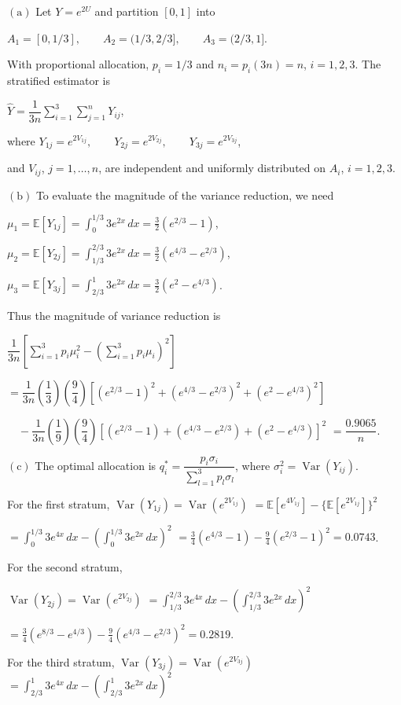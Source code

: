  $\mathrm{(a)}$ Let $Y=e^{2U}$ and partition $[0,1]$ into

$A_1=[0,1/3],\qquad A_2=(1/3,2/3],\qquad A_3=(2/3,1]$.

With proportional allocation, $p_i=1/3$ and $n_i=p_i(3n)=n$, $i=1,2,3$. The stratified estimator is

$\widehat Y=\dfrac1{3n}\sum_{i=1}^3\sum_{j=1}^nY_{ij}$,

where
$Y_{1j}=e^{2V_{1j}},\qquad Y_{2j}=e^{2V_{2j}},\qquad Y_{3j}=e^{2V_{3j}}$,

and $V_{ij}$, $j=1,\ldots,n$, are independent and uniformly distributed on $A_i$, $i=1,2,3$.

$\mathrm{(b)}$ To evaluate the magnitude of the variance reduction, we need

$\mu_1=\mathbb E[Y_{1j}]=\int_0^{1/3}3e^{2x}\,dx=\frac32(e^{2/3}-1)$,

$\mu_2=\mathbb E[Y_{2j}]=\int_{1/3}^{2/3}3e^{2x}\,dx=\frac32(e^{4/3}-e^{2/3})$,

$\mu_3=\mathbb E[Y_{3j}]=\int_{2/3}^{1}3e^{2x}\,dx=\frac32(e^2-e^{4/3})$.

Thus the magnitude of variance reduction is

$\dfrac1{3n}\left[\sum_{i=1}^3p_i\mu_i^2-\left(\sum_{i=1}^3p_i\mu_i\right)^2\right]$

$=\dfrac1{3n}\left(\dfrac13\right)\left(\dfrac94\right)
\left[(e^{2/3}-1)^2+(e^{4/3}-e^{2/3})^2+(e^2-e^{4/3})^2\right]$

$\quad-\dfrac1{3n}\left(\dfrac19\right)\left(\dfrac94\right)
\left[(e^{2/3}-1)+(e^{4/3}-e^{2/3})+(e^2-e^{4/3})\right]^2$
$=\dfrac{0.9065}{n}$.

$\mathrm{(c)}$ The optimal allocation is
$q_i^*=\dfrac{p_i\sigma_i}{\sum_{l=1}^3p_l\sigma_l}$,
where $\sigma_i^2=\operatorname{Var}(Y_{ij})$. 

For the first stratum,
$\operatorname{Var}(Y_{1j})=\operatorname{Var}(e^{2V_{1j}})$
$=\mathbb E[e^{4V_{1j}}]-\{\mathbb E[e^{2V_{1j}}]\}^2$

$=\int_0^{1/3}3e^{4x}\,dx-\left(\int_0^{1/3}3e^{2x}\,dx\right)^2$
$=\frac34(e^{4/3}-1)-\frac94(e^{2/3}-1)^2=0.0743$.

For the second stratum,

$\operatorname{Var}(Y_{2j})=\operatorname{Var}(e^{2V_{2j}})$
$=\int_{1/3}^{2/3}3e^{4x}\,dx-\left(\int_{1/3}^{2/3}3e^{2x}\,dx\right)^2$

$=\frac34(e^{8/3}-e^{4/3})-\frac94(e^{4/3}-e^{2/3})^2=0.2819$.

For the third stratum,
$\operatorname{Var}(Y_{3j})=\operatorname{Var}(e^{2V_{3j}})$
$=\int_{2/3}^{1}3e^{4x}\,dx-\left(\int_{2/3}^{1}3e^{2x}\,dx\right)^2$

